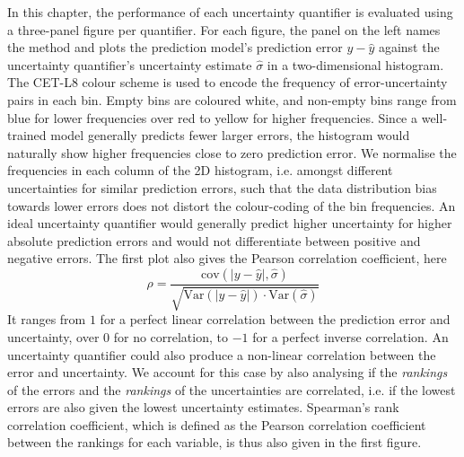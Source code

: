 \newpar In this chapter, the performance of each uncertainty quantifier is evaluated using a three-panel figure per quantifier. For each figure, the panel on the left names the method and plots the prediction model's prediction error $y - \hat{y}$ against the uncertainty quantifier's uncertainty estimate $\hat{\sigma}$ in a two-dimensional histogram. The CET-L8 colour scheme \cite{color-cet-2015, color-cet-2023} is used to encode the frequency of error-uncertainty pairs in each bin. Empty bins are coloured white, and non-empty bins range from blue for lower frequencies over red to yellow for higher frequencies. Since a well-trained model generally predicts fewer larger errors, the histogram would naturally show higher frequencies close to zero prediction error. We normalise the frequencies in each column of the 2D histogram, i.e. amongst different uncertainties for similar prediction errors, such that the data distribution bias towards lower errors does not distort the colour-coding of the bin frequencies. An ideal uncertainty quantifier would generally predict higher uncertainty for higher absolute prediction errors and would not differentiate between positive and negative errors. The first plot also gives the Pearson correlation coefficient, here
\begin{equation*}
    \rho = \frac{\text{cov}(|y - \hat{y}|, \hat{\sigma})}{\sqrt{\text{Var}(|y-\hat{y}|) \cdot \text{Var}(\hat{\sigma})}}
\end{equation*}
It ranges from $1$ for a perfect linear correlation between the prediction error and uncertainty, over $0$ for no correlation, to $-1$ for a perfect inverse correlation. An uncertainty quantifier could also produce a non-linear correlation between the error and uncertainty. We account for this case by also analysing if the \textit{rankings} of the errors and the \textit{rankings} of the uncertainties are correlated, i.e. if the lowest errors are also given the lowest uncertainty estimates. Spearman's rank correlation coefficient, which is defined as the Pearson correlation coefficient between the rankings for each variable, is thus also given in the first figure.

